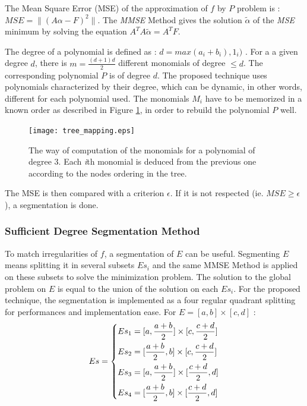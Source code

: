 \documentclass[fleqn,10pt]{SelfArx} %
\begin{document}
The Mean Square Error (MSE) of the approximation of $f$ by $P$  problem is : $MSE = \|(A\alpha - F)^2\|$. The \emph{MMSE} Method gives the solution $\tilde{\alpha}$ of the \emph{MSE} minimum by solving the equation $A^T A \tilde{\alpha} = A^T F$.

The degree of a polynomial is defined as : $d = max(a_i + b_i), 1_i)$ \cite{polynomials}. For a a given degree $d$, there is $m = \frac{(d+1)d}{2}$ different monomials of degree $\leq d$. The corresponding polynomial $P$ is of degree $d$. The proposed technique uses polynomials characterized by their degree, which can be dynamic, in other words, different for each polynomial used.
The monomials $M_i$ have to be memorized in a known order as described in Figure \ref{tree_mapping}, in order to rebuild the polynomial $P$ well.

\begin{figure}
    \centering
    \texttt{[image: tree\_mapping.eps]}
    \caption{The way of computation of the monomials for a polynomial of degree 3. Each \emph{i}th monomial is deduced from the previous one according to the nodes ordering in the tree.}
    \label{tree_mapping}
\end{figure}

The MSE is then compared with a criterion $\epsilon$. If it is not respected (ie. $MSE \geq \epsilon$), a segmentation is done.

\subsubsection{Sufficient Degree Segmentation Method}
To match irregularities of $f$, a segmentation of $E$ can be useful. Segmenting $E$ means splitting it in several subsets $Es_i$ and the same MMSE Method is applied on these subsets to solve the minimization problem. The solution to the global problem on $E$ is equal to the union of the solution on each $Es_i$.
For the proposed technique, the segmentation is implemented as a four regular quadrant splitting for performances and implementation ease. For $E = [a, b]\times [c, d]$ : 
\begin{equation}
 Es = \begin{dcases*}
        Es_1 = [a, \frac{a+b}{2}] \times [c, \frac{c+d}{2}]\\
		Es_2 = [\frac{a+b}{2}, b] \times [c, \frac{c+d}{2}]\\
		Es_3 = [a, \frac{a+b}{2}] \times [\frac{c+d}{2}, d]\\
		Es_4 = [\frac{a+b}{2}, b] \times [\frac{c+d}{2}, d]
        \end{dcases*}
        \label{subE}
\end{equation}
\end{document}
